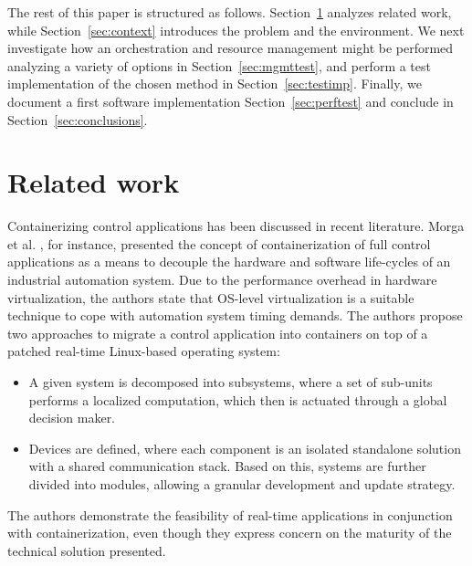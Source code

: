 \documentclass[]{scrartcl}
\begin{document}
The rest of this paper is structured as follows. Section~\ref{sec:relwork} analyzes related work, while Section~\ref{sec:context} introduces the problem and the environment.
We next investigate how an orchestration and resource management might be performed analyzing a variety of options in Section~\ref{sec:mgmttest}, and perform a test implementation of the chosen method in Section~\ref{sec:testimp}.
Finally, we document a first software implementation Section~\ref{sec:perftest} and conclude in Section~\ref{sec:conclusions}.

\section{Related work}
\label{sec:relwork}

Containerizing control applications has been discussed in recent literature. 
Morga et al. \cite{Mogaetal2016}, for instance, presented the concept of containerization of full control applications as a means to decouple the hardware and software life-cycles of an industrial automation system.
Due to the performance overhead in hardware virtualization, the authors state that OS-level virtualization is a suitable technique to cope with automation system timing demands.
The authors propose two approaches to migrate a control application into containers on top of a patched real-time Linux-based operating system: 
\begin{itemize}
	\item A given system is decomposed into subsystems, where a set of sub-units performs a localized computation, which then is actuated through a global decision maker. 
	\item Devices are defined, where each component is an isolated standalone solution with a shared communication stack.
	Based on this, systems are further divided into modules, allowing a granular development and update strategy. 
\end{itemize}
The authors demonstrate the feasibility of real-time applications in conjunction with containerization, even though they express concern on the maturity of the technical solution presented.
\end{document}
